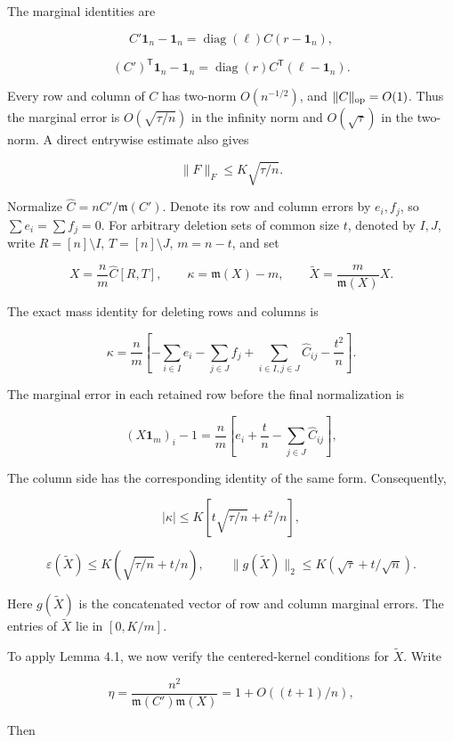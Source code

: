 \documentclass[11pt,a4paper]{article}
\begin{document}
The marginal identities are

\[
C'\mathbf 1_n-\mathbf 1_n=\operatorname{diag}(\ell)C(r-\mathbf 1_n),
\]

\[
(C')^{\mathsf T}\mathbf 1_n-\mathbf 1_n=\operatorname{diag}(r)C^{\mathsf T}(\ell-\mathbf 1_n).
\]

Every row and column of \(C\) has two-norm \(O(n^{-1/2})\), and \(\|C\|_{\rm op}=O(1)\). Thus the marginal error is \(O(\sqrt{\tau/n})\) in the infinity norm and \(O(\sqrt\tau)\) in the two-norm. A direct entrywise estimate also gives

\[
\|F\|_F\le K\sqrt{\tau/n}.
\]

Normalize \(\widehat C=nC'/\mathfrak m(C')\). Denote its row and column errors by \(e_i,f_j\), so \(\sum e_i=\sum f_j=0\). For arbitrary deletion sets of common size \(t\), denoted by \(I,J\), write \(R=[n]\setminus I\), \(T=[n]\setminus J\), \(m=n-t\), and set

\[
X=\frac n m\widehat C[R,T],\qquad \kappa=\mathfrak m(X)-m,\qquad \widetilde X=\frac m{\mathfrak m(X)}X.
\]

The exact mass identity for deleting rows and columns is

\begin{equation}
\kappa=\frac n m\left[-\sum_{i\in I}e_i-\sum_{j\in J}f_j+\sum_{i\in I,j\in J}\widehat C_{ij}-\frac{t^2}{n}\right].
\tag{4.1}
\label{eq-deletion-mass}
\end{equation}

The marginal error in each retained row before the final normalization is

\[
(X\mathbf 1_m)_i-1=\frac n m\left[e_i+\frac t n-\sum_{j\in J}\widehat C_{ij}\right],
\]

The column side has the corresponding identity of the same form. Consequently,

\[
|\kappa|\le K\left[t\sqrt{\tau/n}+t^2/n\right],
\]

\[
\varepsilon(\widetilde X)\le K(\sqrt{\tau/n}+t/n),\qquad \|g(\widetilde X)\|_2\le K(\sqrt\tau+t/\sqrt n).
\]

Here \(g(\widetilde X)\) is the concatenated vector of row and column marginal errors. The entries of \(\widetilde X\) lie in \([0,K/m]\).

To apply Lemma 4.1, we now verify the centered-kernel conditions for \(\widetilde X\). Write

\[
\eta=\frac{n^2}{\mathfrak m(C')\mathfrak m(X)}=1+O((t+1)/n),
\]

Then
\end{document}
